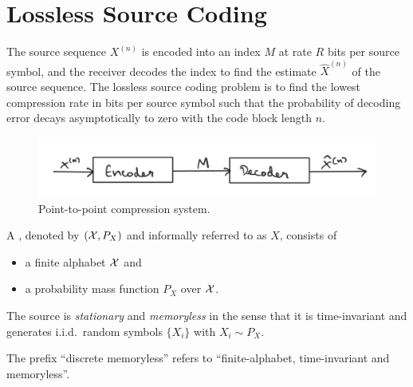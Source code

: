 \documentclass[11pt,a4paper]{article}
\begin{document}



\section{Lossless Source Coding}

\begin{problem*}
    The source sequence $X^{(n)}$ is encoded into an index $M$ at rate $R$ bits per source symbol, and the receiver decodes the index to find the estimate $\hat{X}^{(n)}$ of the source sequence. The lossless source coding problem is to find the lowest compression rate in bits per source symbol such that the probability of decoding error decays asymptotically to zero with the code block length $n$.
\end{problem*}

\begin{figure}[ht]
    \centering
    \includegraphics[width=0.7\linewidth]{images/Source_Coding.png}
    \caption{Point-to-point compression system.}
    \label{fig:Source_Coding}
\end{figure}

\begin{definition}
    A , denoted by $(\mathcal{X},P_X)$ and informally referred to as $X$, consists of
    \begin{itemize}
        \item a finite alphabet $\mathcal{X}$ and 
        \item a probability mass function $P_X$ over $\mathcal{X}$.
    \end{itemize}
    The source is \textit{stationary} and \textit{memoryless} in the sense that it is time-invariant and generates i.i.d.~random symbols $\{X_i\}$ with $X_i\sim P_X$.
\end{definition}

\begin{remark}
    The prefix ``discrete memoryless'' refers to ``finite-alphabet, time-invariant and memoryless''.
\end{remark}
\end{document}
